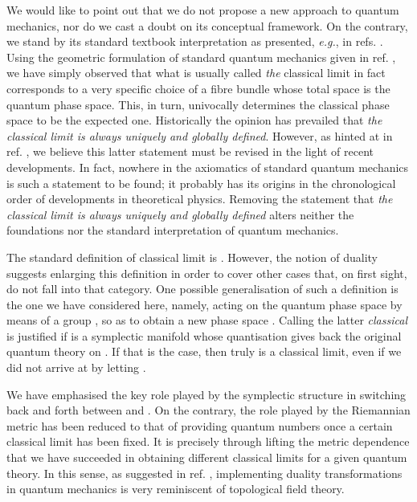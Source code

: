 \documentclass[a4paper,a4paper]{article}
\begin{document}
We would like to point out that we do not propose a new approach to 
quantum mechanics, nor do we cast a doubt on its conceptual framework. 
On the contrary, we stand by its standard textbook interpretation as presented, 
{\it e.g.}, in refs. \cite{GALINDO, DR}. 
Using the geometric formulation of standard quantum mechanics given in ref. \cite{ASHTEKAR},
we have simply observed that what is usually called {\it the} classical limit 
in fact corresponds to a very specific choice of a fibre bundle whose total 
space is the quantum phase space. This, in turn, univocally determines the 
classical phase space to be the expected one.  Historically the opinion has 
prevailed that {\it the classical limit is always uniquely and globally defined}. 
However, as hinted at in ref. \cite{VAFA}, we believe this latter statement must be revised 
in the light of recent developments. In fact, nowhere in the axiomatics of standard quantum 
mechanics is such a statement to be found; it probably has its origins in the chronological 
order of developments in theoretical physics. Removing the statement that 
{\it the classical limit is always uniquely and globally defined} alters neither the foundations 
nor the standard interpretation of quantum mechanics. 

The standard definition of classical limit is \coordHE{}.
However, the notion of duality suggests enlarging this definition 
in order to cover other cases that, on first sight, do not fall into that category.
One possible generalisation of such a definition is the one we have 
considered here, namely, acting on the quantum phase space \coordHE{} by 
means of a group \coordHE{}, so as to obtain a new phase space \coordHE{}. 
Calling the latter {\it classical} is justified if \coordHE{} is a 
symplectic manifold whose quantisation gives back the original 
quantum theory on \coordHE{}. If that is the case, then \coordHE{} truly 
is a classical limit, even if we did not arrive at \coordHE{} by letting 
\coordHE{}.

We have emphasised the key role played by the symplectic structure in switching 
back and forth between \coordHE{} and \coordHE{}. On the contrary, the role played 
by the Riemannian metric \coordHE{} has been reduced to 
that of providing quantum numbers once a certain classical limit has 
been fixed. It is precisely through lifting the metric dependence that we
have succeeded in obtaining different classical limits for a given quantum 
theory. In this sense, as suggested in ref. \cite{NOS}, implementing 
duality transformations in quantum mechanics is very reminiscent of 
topological field theory. 
\end{document}
